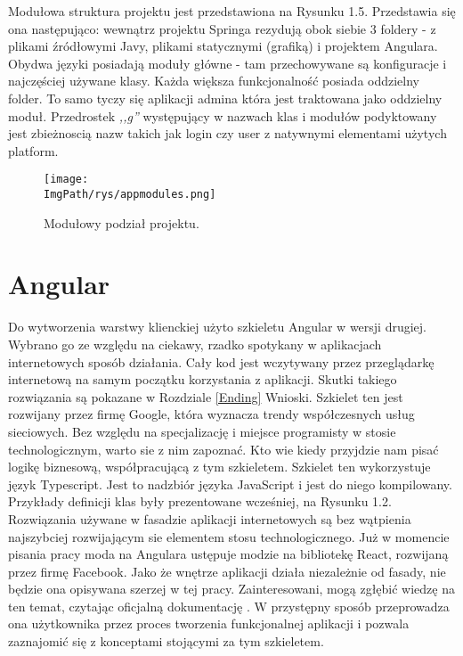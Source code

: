 \documentclass[a4paper,12pt,twoside,openany]{report}
\newcommand{\ImgPath}{.}
\begin{document}
Modułowa struktura projektu jest przedstawiona na Rysunku 1.5. Przedstawia się ona następująco: wewnątrz projektu Springa rezydują obok siebie 3 foldery - z plikami źródłowymi Javy, plikami statycznymi (grafiką) i projektem Angulara. Obydwa języki posiadają moduły główne - tam przechowywane są konfiguracje i najczęściej używane klasy. Każda większa funkcjonalność posiada oddzielny folder. To samo tyczy się aplikacji admina która jest traktowana jako oddzielny moduł. Przedrostek \textit{,,g''} występujący w nazwach klas i modułów podyktowany jest zbieżnoscią nazw takich jak login czy user z natywnymi elementami użytych platform.
		\begin{figure}[!htbp]
			\begin{center}
				\centering
				\texttt{[image: \\ImgPath/rys/appmodules.png]}
			\end{center}
			\caption{Modułowy podział projektu.}
			\label{UMLTS}
		\end{figure}
\chapter{Angular}
Do wytworzenia warstwy klienckiej użyto szkieletu Angular w wersji drugiej. Wybrano go ze względu na ciekawy, rzadko spotykany w aplikacjach internetowych sposób działania. Cały kod jest wczytywany przez przeglądarkę internetową na samym początku korzystania z aplikacji. Skutki takiego rozwiązania są pokazane w Rozdziale \ref{Ending} Wnioski. Szkielet ten jest rozwijany przez firmę Google, która wyznacza trendy współczesnych usług sieciowych. Bez względu na specjalizację i miejsce programisty w stosie technologicznym, warto sie z nim zapoznać. Kto wie kiedy przyjdzie nam pisać logikę biznesową, współpracującą z tym szkieletem.
Szkielet ten wykorzystuje język Typescript. Jest to nadzbiór języka JavaScript i jest do niego kompilowany. Przykłady definicji klas były prezentowane wcześniej, na Rysunku 1.2. Rozwiązania używane w fasadzie aplikacji internetowych są bez wątpienia najszybciej rozwijającym sie elementem stosu technologicznego. Już w momencie pisania pracy moda na Angulara ustępuje modzie na bibliotekę React, rozwijaną przez firmę Facebook. Jako że wnętrze aplikacji działa niezależnie od fasady, nie będzie ona opisywana szerzej w tej pracy. Zainteresowani, mogą zgłębić wiedzę na ten temat, czytając oficjalną dokumentację \cite{Angular}. W przystępny sposób przeprowadza ona użytkownika przez proces tworzenia funkcjonalnej aplikacji i pozwala zaznajomić się z konceptami stojącymi za tym szkieletem.
\end{document}
